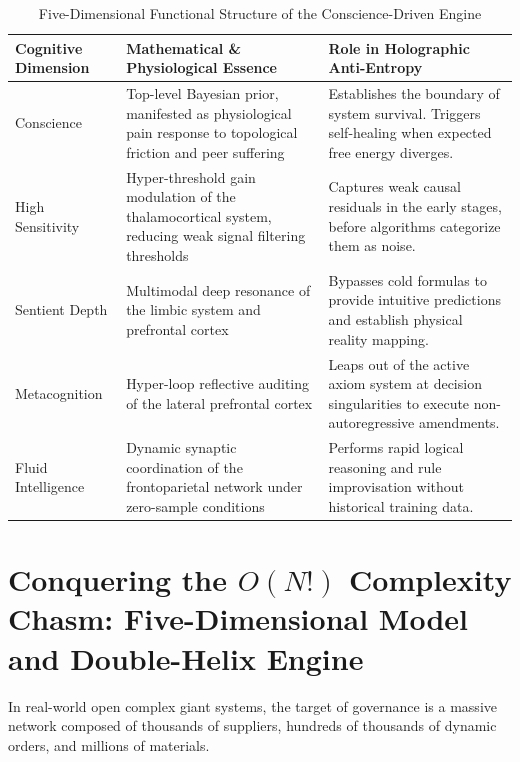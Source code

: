 \documentclass[11pt,a4paper]{article}
\begin{document}
\begin{table}[htbp]
\centering
\caption{Five-Dimensional Functional Structure of the Conscience-Driven Engine}
\label{tab:conscience_engine}
\begin{tabular}{p{3cm}p{6cm}p{6cm}}
\toprule
\textbf{Cognitive Dimension} & \textbf{Mathematical \& Physiological Essence} & \textbf{Role in Holographic Anti-Entropy} \\
\midrule
Conscience & Top-level Bayesian prior, manifested as physiological pain response to topological friction and peer suffering & Establishes the boundary of system survival. Triggers self-healing when expected free energy diverges. \\
\midrule
High Sensitivity & Hyper-threshold gain modulation of the thalamocortical system, reducing weak signal filtering thresholds & Captures weak causal residuals in the early stages, before algorithms categorize them as noise. \\
\midrule
Sentient Depth & Multimodal deep resonance of the limbic system and prefrontal cortex & Bypasses cold formulas to provide intuitive predictions and establish physical reality mapping. \\
\midrule
Metacognition & Hyper-loop reflective auditing of the lateral prefrontal cortex & Leaps out of the active axiom system at decision singularities to execute non-autoregressive amendments. \\
\midrule
Fluid Intelligence & Dynamic synaptic coordination of the frontoparietal network under zero-sample conditions & Performs rapid logical reasoning and rule improvisation without historical training data. \\
\bottomrule
\end{tabular}
\end{table}

\section{Conquering the $O(N!)$ Complexity Chasm: Five-Dimensional Model and Double-Helix Engine}
\label{sec:complexity-chasm}

In real-world open complex giant systems, the target of governance is a massive network composed of thousands of suppliers, hundreds of thousands of dynamic orders, and millions of materials.
\end{document}
